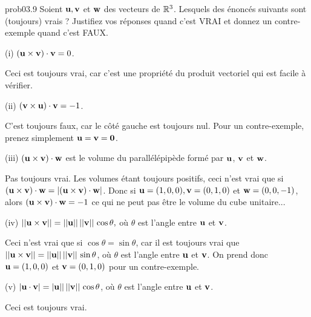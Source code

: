\bigskip
 \begin{sol}{prob03.9}  Soient $\mathbf{u} , \mathbf{v} $ et $\mathbf{w} $ des vecteurs de $\mathbb{R}^3$.  Lesquels des \'enonc\'es suivants sont (toujours) vrais ? Justifiez vos réponses quand c'est VRAI et donnez un contre-exemple quand c'est FAUX.
\medskip

(i) $(\mathbf{u}\times \mathbf{v})\cdot \mathbf{v}=0$. 

\soln Ceci est toujours vrai, car c'est une propriété du produit vectoriel qui est facile à v\'erifier.
 
\medskip

(ii) $(\mathbf{v}\times \mathbf{u})\cdot \mathbf{v}=-1$. 

\soln C'est toujours faux, car le côté gauche est toujours nul. Pour un contre-exemple, prenez simplement $\mathbf{u}=\mathbf{v}=\mathbf{0}$.
 
\medskip

(iii) $(\mathbf{u}\times \mathbf{v})\cdot \mathbf{w}$ est le volume du parallélépipède formé par $\mathbf{u}$, $\mathbf{v}$ et $\mathbf{w}$. 


\soln  Pas toujours vrai. Les volumes étant toujours positifs, ceci n'est vrai que si $(\mathbf{u}\times \mathbf{v})\cdot \mathbf{w}= |(\mathbf{u}\times \mathbf{v})\cdot \mathbf{w}|$. Donc si $\mathbf{u}=(1,0,0), \mathbf{v}=(0,1,0)$ et $\mathbf{w}=(0,0,-1)$, alors $(\mathbf{u}\times \mathbf{v})\cdot \mathbf{w}=-1$ ce qui ne peut pas être le volume du cube unitaire...
 
\medskip

(iv) $||\mathbf{u}\times \mathbf{v}||=||\mathbf{u}||\,||\mathbf{v}||\,\cos\theta,$ où $\theta$ est l'angle entre $\mathbf{u}$ et $\mathbf{v}$. 


\soln Ceci n'est vrai que si $\cos\theta=\sin \theta$, car il est toujours vrai que $||\mathbf{u}\times \mathbf{v}||=||\mathbf{u}||\,||\mathbf{v}||\,\sin\theta$, où $\theta$ est l'angle entre $\mathbf{u}$ et $\mathbf{v}$. On prend donc $\mathbf{u}=(1,0,0)$ et $\mathbf{v}=(0,1,0)$ pour un contre-exemple.

\medskip 

(v) $|\mathbf{u}\cdot \mathbf{v}|=|\mathbf{u}||\,||\mathbf{v}||\,\cos\theta$, 
où $\theta$ est l'angle entre $\mathbf{u}$ et $\mathbf{v}$. 

\soln Ceci est toujours vrai.
 
\end{sol} 







